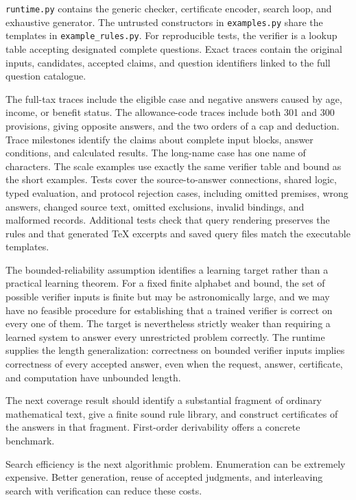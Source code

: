 \documentclass[11pt,twoside]{article}
\theoremstyle{definition}
\begin{document}
\texttt{runtime.py} contains the generic checker, certificate encoder, search
loop, and exhaustive generator. The untrusted constructors in
\texttt{examples.py} share the templates in \texttt{example\_rules.py}.
For reproducible tests, the verifier is a lookup table accepting \VerifierQuestionCount{}
designated complete questions. Exact traces contain the original inputs,
candidates, accepted claims, and question identifiers linked to the full
question catalogue.


The full-tax traces include the eligible case and negative answers caused
by age, income, or benefit status. The allowance-code traces include both
301 and 300 provisions, giving opposite answers, and the two orders of a
cap and deduction. Trace milestones identify the claims about complete
input blocks, answer conditions, and calculated results. The long-name case has one name of
\LongNameLength{} characters. The scale examples use exactly the same verifier table
and bound as the short examples. Tests cover the source-to-answer
connections, shared logic, typed evaluation, and protocol rejection cases,
including omitted premises, wrong answers, changed source text, omitted
exclusions, invalid bindings, and malformed records. Additional tests check
that query rendering preserves the rules and that generated TeX excerpts
and saved query files match the executable templates.

The bounded-reliability assumption identifies a learning target rather than a
practical learning theorem. For a fixed finite alphabet and bound, the set of
possible verifier inputs is finite but may be astronomically large, and we may
have no feasible procedure for establishing that a trained verifier is correct
on every one of them. The target is nevertheless strictly weaker than requiring
a learned system to answer every unrestricted problem correctly. The runtime
supplies the length generalization: correctness on bounded verifier inputs
implies correctness of every accepted answer, even when the request, answer,
certificate, and computation have unbounded length.

The next coverage result should identify a substantial fragment of ordinary
mathematical text, give a finite sound rule library, and construct certificates
of the answers in that fragment. First-order derivability offers a concrete
benchmark.

Search efficiency is the next algorithmic problem. Enumeration can be
extremely expensive.
Better generation, reuse of accepted judgments, and interleaving search
with verification can reduce these costs.
\end{document}
